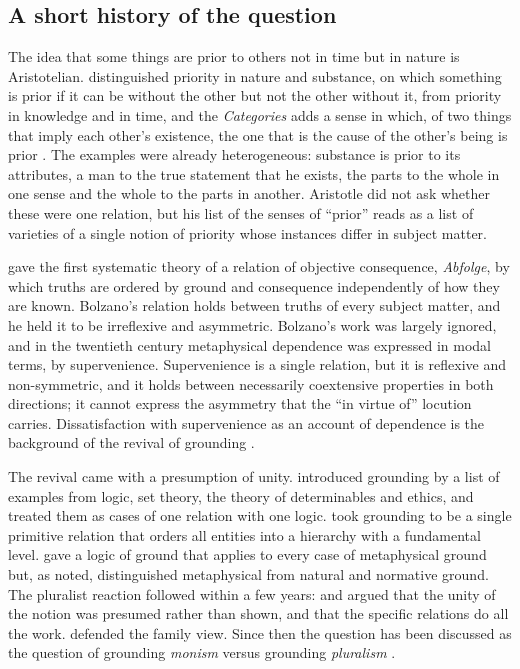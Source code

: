 \documentclass{situationist-preprint}
\begin{document}
\subsection{A short history of the question}\label{s:history}

The idea that some things are prior to others not in time but in nature is Aristotelian. \citet[$\Delta$.11]{AristotleMet} distinguished priority in nature and substance, on which something is prior if it can be without the other but not the other without it, from priority in knowledge and in time, and the \emph{Categories} adds a sense in which, of two things that imply each other's existence, the one that is the cause of the other's being is prior \citep[12, 14b10--23]{AristotleCat}. The examples were already heterogeneous: substance is prior to its attributes, a man to the true statement that he exists, the parts to the whole in one sense and the whole to the parts in another. Aristotle did not ask whether these were one relation, but his list of the senses of \enquote{prior} reads as a list of varieties of a single notion of priority whose instances differ in subject matter.

\citet{Bolzano1837} gave the first systematic theory of a relation of objective consequence, \emph{Abfolge}, by which truths are ordered by ground and consequence independently of how they are known. Bolzano's relation holds between truths of every subject matter, and he held it to be irreflexive and asymmetric. Bolzano's work was largely ignored, and in the twentieth century metaphysical dependence was expressed in modal terms, by supervenience. Supervenience is a single relation, but it is reflexive and non-symmetric, and it holds between necessarily coextensive properties in both directions; it cannot express the asymmetry that the \enquote{in virtue of} locution carries. Dissatisfaction with supervenience as an account of dependence is the background of the revival of grounding \citep{Fine2001,Schaffer2009,Rosen2010}.

The revival came with a presumption of unity. \citet{Rosen2010} introduced grounding by a list of examples from logic, set theory, the theory of determinables and ethics, and treated them as cases of one relation with one logic. \citet{Schaffer2009} took grounding to be a single primitive relation that orders all entities into a hierarchy with a fundamental level. \citet{Fine2012} gave a logic of ground that applies to every case of metaphysical ground but, as noted, distinguished metaphysical from natural and normative ground. The pluralist reaction followed within a few years: \citet{Wilson2014} and \citet{Koslicki2015} argued that the unity of the notion was presumed rather than shown, and that the specific relations do all the work. \citet{Bennett2017} defended the family view. Since then the question has been discussed as the question of grounding \emph{monism} versus grounding \emph{pluralism} \citep{Berker2018}.
\end{document}
